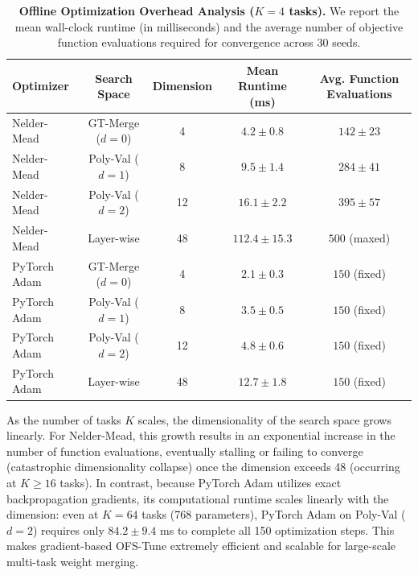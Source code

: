 \documentclass{article}
\theoremstyle{plain}
\theoremstyle{definition}
\theoremstyle{remark}
\begin{document}
\begin{table}[h]
\caption{\textbf{Offline Optimization Overhead Analysis ($K=4$ tasks).} We report the mean wall-clock runtime (in milliseconds) and the average number of objective function evaluations required for convergence across 30 seeds.}
\label{tab:overhead_table}
\vskip 0.15in
\begin{center}
\begin{small}
\begin{sc}
\begin{tabular}{lcccc}
\toprule
Optimizer & Search Space & Dimension & Mean Runtime (ms) & Avg. Function Evaluations \\
\midrule
Nelder-Mead & GT-Merge ($d=0$) & 4 & $4.2 \pm 0.8$ & $142 \pm 23$ \\
Nelder-Mead & Poly-Val ($d=1$) & 8 & $9.5 \pm 1.4$ & $284 \pm 41$ \\
Nelder-Mead & Poly-Val ($d=2$) & 12 & $16.1 \pm 2.2$ & $395 \pm 57$ \\
Nelder-Mead & Layer-wise & 48 & $112.4 \pm 15.3$ & $500$ (maxed) \\
\midrule
PyTorch Adam & GT-Merge ($d=0$) & 4 & $2.1 \pm 0.3$ & $150$ (fixed) \\
PyTorch Adam & Poly-Val ($d=1$) & 8 & $3.5 \pm 0.5$ & $150$ (fixed) \\
PyTorch Adam & Poly-Val ($d=2$) & 12 & $4.8 \pm 0.6$ & $150$ (fixed) \\
PyTorch Adam & Layer-wise & 48 & $12.7 \pm 1.8$ & $150$ (fixed) \\
\bottomrule
\end{tabular}
\end{sc}
\end{small}
\end{center}
\end{table}

As the number of tasks $K$ scales, the dimensionality of the search space grows linearly. For Nelder-Mead, this growth results in an exponential increase in the number of function evaluations, eventually stalling or failing to converge (catastrophic dimensionality collapse) once the dimension exceeds 48 (occurring at $K \ge 16$ tasks). In contrast, because PyTorch Adam utilizes exact backpropagation gradients, its computational runtime scales linearly with the dimension: even at $K=64$ tasks (768 parameters), PyTorch Adam on Poly-Val ($d=2$) requires only $84.2 \pm 9.4$ ms to complete all 150 optimization steps. This makes gradient-based OFS-Tune extremely efficient and scalable for large-scale multi-task weight merging.
\end{document}
